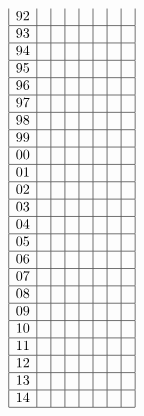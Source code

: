 \documentclass[a4j]{jarticle}
\begin{document}
\begin{align*}
\begin{array}{|c|c|c|c|c|c|c|c|}
          92&&&&&&& \\ \hline
          93&&&&&&& \\ \hline
          94&&&&&&& \\ \hline
          95&&&&&&& \\ \hline
          96&&&&&&& \\ \hline
          97&&&&&&& \\ \hline
          98&&&&&&& \\ \hline
          99&&&&&&& \\ \hline
          00&&&&&&& \\ \hline
          01&&&&&&& \\ \hline
          02&&&&&&& \\ \hline
          03&&&&&&& \\ \hline
          04&&&&&&& \\ \hline
          05&&&&&&& \\ \hline
          06&&&&&&& \\ \hline
          07&&&&&&& \\ \hline
          08&&&&&&& \\ \hline
          09&&&&&&& \\ \hline
          10&&&&&&& \\ \hline
          11&&&&&&& \\ \hline
          12&&&&&&& \\ \hline
          13&&&&&&& \\ \hline
          14&&&&&&& \\ \hline
          \end{array}
     \end{align*}
\end{document}
